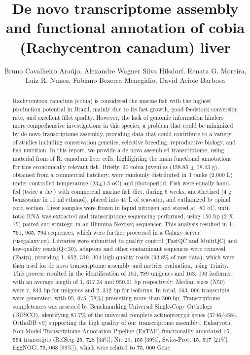 \documentclass[twoside]{article}
\title{\vspace{-15mm}\fontsize{24pt}{10pt}\selectfont\textbf{ De novo transcriptome assembly and functional annotation of cobia (Rachycentron canadum) liver }} %
\author{ Bruno Cavalheiro Ara\'ujo,  Alexandre Wagner Silva Hilsdorf,  Renata G. Moreira,  Luiz R. Nunes,  Fabiano Bezerra Menegidio,  David Aciole Barbosa }
\affil{ UNIVERSIDADE DE MOGI DAS CRUZES }
\date{}
\begin{document}
  
  
  \maketitle %
  
  
  \thispagestyle{fancy} %
  
  
  \begin{abstract}
  Rachycentron canadum (cobia) is considered the marine fish with the highest production potential in Brazil,  mainly due to its fast growth,  good feedstock conversion rate,  and excellent fillet quality. However,  the lack of genomic information hinders more comprehensive investigations in this species,  a problem that could be minimized by de novo transcriptome assembly,  providing data that could contribute to a variety of studies including conservation genetics,  selective breeding,  reproductive biology,  and fish nutrition. In this report,  we provide a de novo assembled transcriptome,  using material from of R. canadum liver cells,  highlighting the main functional annotations for this economically relevant fish. Briefly,  90 cobia juveniles (128.85 $\pm$ 18.43 g),  obtained from a commercial hatchery,  were randomly distributed in 3 tanks (2.000 L) under controlled temperature (23$\pm$1.5 oC) and photoperiod. Fish were equally hand-fed (twice a day) with commercial marine fish diet,  during 6 weeks,  anesthetized (4 g benzocaine in 10 ml ethanol),  placed into 40 L of seawater,  and euthanized by spinal cord section. Liver samples were frozen in liquid nitrogen and stored at -80 oC,  until total RNA was extracted and transcriptome sequencing performed,  using 150 bp (2 X 75) paired-end strategy,  in an Illumina Nextseq sequencer. This analysis resulted in 1, 761, 965, 794 sequences,  which were further processed in a Galaxy server (usegalaxy.eu). Libraries were submitted to quality control (FastQC and MultiQC) and low-quality  reads(Q<30),  adapters and other contaminant sequences were removed (Fastp),  providing 1, 652, 319, 304 high-quality reads (93.8\% of raw data),  which were then used for de novo transcriptome assembly and metrics evaluation,  using Trinity. This process resulted in the identification of 101, 789 unigenes and 163, 096 isoforms,  with an average length of 1, 617.34 and 950.61 bp respectively. Median sizes (N50) were 7, 843 bp for unigenes and 2, 312 bp for isoforms. In total,  163, 096 transcripts were generated,  with 95, 075 (58\%) presenting more than 500 bp. Transcriptome completeness was assessed by Benchmarking Universal Single-Copy Orthologs (BUSCO),  identifying 81.7\% of the universal complete actinopterygii genes (3746/4584,  OrthoDB v9) supporting the high quality of our transcriptome assembly.. Eukaryotic Non-Model Transcriptome Annotation Pipeline (EnTAP) functionallly annotated 75, 554 transcripts (RefSeq: 25, 728 [34\%]; Nr: 29, 155 [39\%],  Swiss-Prot: 15, 507 [21\%]; EggNOG: 75, 068 [99\%]),  which were related to 75, 060 Gene 
\end{abstract}
\end{document}
